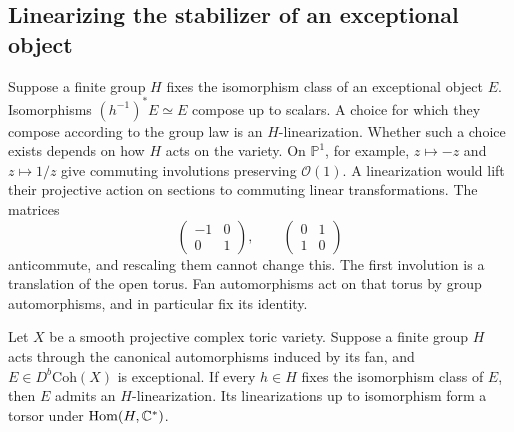 \subsection{Linearizing the stabilizer of an exceptional object}\label{sec:stabilizer}

Suppose a finite group $H$ fixes the isomorphism class of an exceptional object $E$. Isomorphisms $(h^{-1})^*E\simeq E$ compose up to scalars. A choice for which they compose according to the group law is an $H$-linearization. Whether such a choice exists depends on how $H$ acts on the variety. On $\mathbb P^1$, for example, $z\mapsto-z$ and $z\mapsto 1/z$ give commuting involutions preserving $\mathcal O(1)$. A linearization would lift their projective action on sections to commuting linear transformations. The matrices
\[
      \begin{pmatrix}-1&0\\0&1\end{pmatrix},\qquad
      \begin{pmatrix}0&1\\1&0\end{pmatrix}
\]
anticommute, and rescaling them cannot change this. The first involution is a translation of the open torus. Fan automorphisms act on that torus by group automorphisms, and in particular fix its identity.

\begin{proposition}\label{prop:stabilizers}
Let $X$ be a smooth projective complex toric variety. Suppose a finite group $H$ acts through the canonical automorphisms induced by its fan, and $E\in D^b\mathrm{Coh}(X)$ is exceptional. If every $h\in H$ fixes the isomorphism class of $E$, then $E$ admits an $H$-linearization. Its linearizations up to isomorphism form a torsor under $\mathrm{Hom}(H,\mathbb C^*)$.
\end{proposition}

